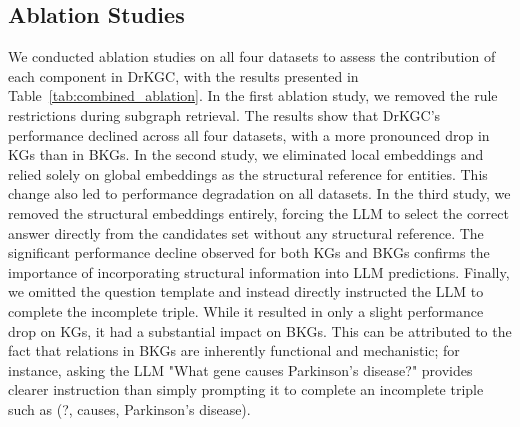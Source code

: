 \documentclass[11pt]{article}
\begin{document}
\subsection{Ablation Studies}
We conducted ablation studies on all four datasets to assess the contribution of each component in DrKGC, with the results presented in Table~\ref{tab:combined_ablation}. In the first ablation study, we removed the rule restrictions during subgraph retrieval. The results show that DrKGC’s performance declined across all four datasets, with a more pronounced drop in KGs than in BKGs. In the second study, we eliminated local embeddings and relied solely on global embeddings as the structural reference for entities. This change also led to performance degradation on all datasets. In the third study, we removed the structural embeddings entirely, forcing the LLM to select the correct answer directly from the candidates set without any structural reference. The significant performance decline observed for both KGs and BKGs confirms the importance of incorporating structural information into LLM predictions. Finally, we omitted the question template and instead directly instructed the LLM to complete the incomplete triple. While it resulted in only a slight performance drop on KGs, it had a substantial impact on BKGs. This can be attributed to the fact that relations in BKGs are inherently functional and mechanistic; for instance, asking the LLM "What gene causes Parkinson's disease?" provides clearer instruction than simply prompting it to complete an incomplete triple such as (?, causes, Parkinson's disease).
\end{document}
